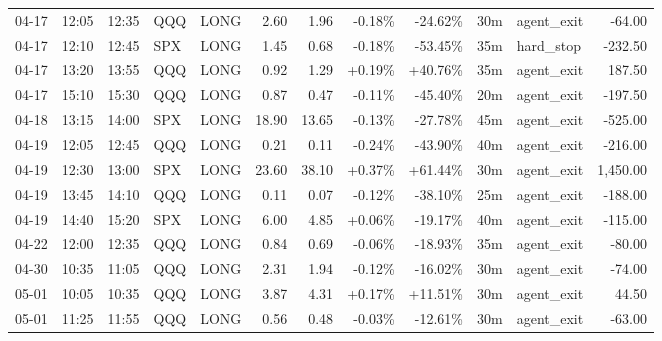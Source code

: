 \documentclass[11pt,a4paper,twoside]{article}
\begin{document}
\begin{center}
\begin{longtable}{>{\color{txtmain}}l l l l l r r r r r >{\color{txtmain}}l r}
04-17 & 12:05 & 12:35 & QQQ & LONG & 2.60 & 1.96 & \textcolor{lossred}{-0.18\%} & \textcolor{lossred}{-24.62\%} & 30m & agent\_exit & \textcolor{lossred}{-64.00} \\
04-17 & 12:10 & 12:45 & SPX & LONG & 1.45 & 0.68 & \textcolor{lossred}{-0.18\%} & \textcolor{lossred}{-53.45\%} & 35m & hard\_stop & \textcolor{lossred}{-232.50} \\
04-17 & 13:20 & 13:55 & QQQ & LONG & 0.92 & 1.29 & \textcolor{wingreen}{+0.19\%} & \textcolor{wingreen}{+40.76\%} & 35m & agent\_exit & \textcolor{wingreen}{187.50} \\
04-17 & 15:10 & 15:30 & QQQ & LONG & 0.87 & 0.47 & \textcolor{lossred}{-0.11\%} & \textcolor{lossred}{-45.40\%} & 20m & agent\_exit & \textcolor{lossred}{-197.50} \\
04-18 & 13:15 & 14:00 & SPX & LONG & 18.90 & 13.65 & \textcolor{lossred}{-0.13\%} & \textcolor{lossred}{-27.78\%} & 45m & agent\_exit & \textcolor{lossred}{-525.00} \\
04-19 & 12:05 & 12:45 & QQQ & LONG & 0.21 & 0.11 & \textcolor{lossred}{-0.24\%} & \textcolor{lossred}{-43.90\%} & 40m & agent\_exit & \textcolor{lossred}{-216.00} \\
04-19 & 12:30 & 13:00 & SPX & LONG & 23.60 & 38.10 & \textcolor{wingreen}{+0.37\%} & \textcolor{wingreen}{+61.44\%} & 30m & agent\_exit & \textcolor{wingreen}{1,450.00} \\
04-19 & 13:45 & 14:10 & QQQ & LONG & 0.11 & 0.07 & \textcolor{lossred}{-0.12\%} & \textcolor{lossred}{-38.10\%} & 25m & agent\_exit & \textcolor{lossred}{-188.00} \\
04-19 & 14:40 & 15:20 & SPX & LONG & 6.00 & 4.85 & \textcolor{wingreen}{+0.06\%} & \textcolor{lossred}{-19.17\%} & 40m & agent\_exit & \textcolor{lossred}{-115.00} \\
04-22 & 12:00 & 12:35 & QQQ & LONG & 0.84 & 0.69 & \textcolor{lossred}{-0.06\%} & \textcolor{lossred}{-18.93\%} & 35m & agent\_exit & \textcolor{lossred}{-80.00} \\
04-30 & 10:35 & 11:05 & QQQ & LONG & 2.31 & 1.94 & \textcolor{lossred}{-0.12\%} & \textcolor{lossred}{-16.02\%} & 30m & agent\_exit & \textcolor{lossred}{-74.00} \\
05-01 & 10:05 & 10:35 & QQQ & LONG & 3.87 & 4.31 & \textcolor{wingreen}{+0.17\%} & \textcolor{wingreen}{+11.51\%} & 30m & agent\_exit & \textcolor{wingreen}{44.50} \\
05-01 & 11:25 & 11:55 & QQQ & LONG & 0.56 & 0.48 & \textcolor{lossred}{-0.03\%} & \textcolor{lossred}{-12.61\%} & 30m & agent\_exit & \textcolor{lossred}{-63.00} \\

\end{longtable}
\end{center}
\end{document}
